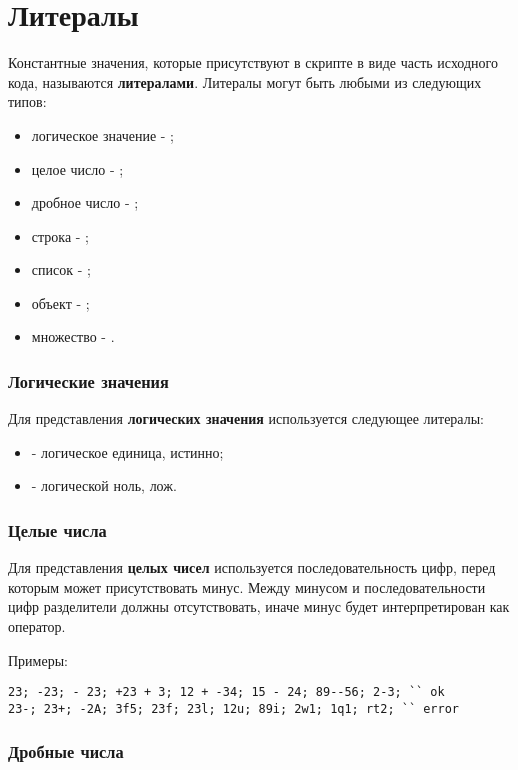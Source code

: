 \documentclass[a4paper, 14pt]{extarticle}
\newenvironment{icItems}
	{ \begin{itemize} [noitemsep,nolistsep] }
	{ \end{itemize} }
\begin{document}
\newpage
\section{Литералы}
	
	Константные значения, которые присутствуют в скрипте в виде часть исходного кода, называются {\bf литералами}.
	Литералы могут быть любыми из следующих типов:
\begin{icItems}
	\item логическое значение - ;
	\item целое число - ;
	\item дробное число - ;
	\item строка - ;
	\item список - ;
	\item объект - ;
	\item множество - .
\end{icItems}

\subsubsection{Логические значения}

	Для представления {\bf логических значения} используется следующее литералы:
\begin{icItems}
	\item {} - логическое единица, истинно;
	\item {} - логической ноль, лож.
\end{icItems}

\subsubsection{Целые числа}

	Для представления {\bf целых чисел} используется последовательность цифр, перед которым может присутствовать минус. Между минусом и последовательности цифр разделители должны отсутствовать, иначе минус будет интерпретирован как оператор.
	
\noindent Примеры:
\begin{lstlisting}[numbers=none]
23; -23; - 23; +23 + 3; 12 + -34; 15 - 24; 89--56; 2-3; `` ok
23-; 23+; -2А; 3f5; 23f; 23l; 12u; 89i; 2w1; 1q1; rt2; `` error 
\end{lstlisting}
	
\subsubsection{Дробные числа}
\end{document}
